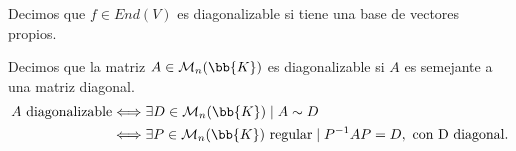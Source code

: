 \begin{definicion}
    Decimos que $f\in End(V)$ es diagonalizable si tiene una base de vectores propios.
\end{definicion}

\begin{definicion}
    Decimos que la matriz $A\in \mathcal{M}_n(\bb{K})$ es diagonalizable si $A$ es semejante a una matriz diagonal.
    \begin{equation*}\begin{split}
        A \text{ diagonalizable} & \Longleftrightarrow \exists D \in \mathcal{M}_n(\bb{K}) \mid A \sim D\\
        & \Longleftrightarrow \exists P \in \mathcal{M}_n(\bb{K}) \text{ regular} \mid P^{-1}AP=D, \text{ con D diagonal}.
    \end{split}\end{equation*}
\end{definicion}



